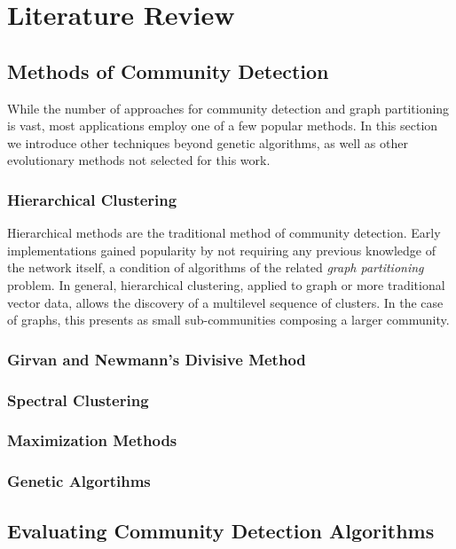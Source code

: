 \chapter{Literature Review}




\section{Methods of Community Detection}
While the number of approaches for community detection and graph partitioning is vast, most applications employ one of a few popular methods. In this section we introduce other techniques beyond genetic algorithms, as well as other evolutionary methods not selected for this work. 

\subsection{Hierarchical Clustering}
Hierarchical methods are the traditional method of community detection. Early implementations gained popularity by not requiring any previous knowledge of the network itself, a condition of algorithms of the related \textit{graph partitioning} problem. In general, hierarchical clustering, applied to graph or more traditional vector data, allows the discovery of a multilevel sequence of clusters. In the case of graphs, this presents as small sub-communities composing a larger community.


\subsection{Girvan and Newmann's Divisive Method}
\cite{Girvan2002}




\subsection{Spectral Clustering}



\subsection{Maximization Methods}





\subsection{Genetic Algortihms}





\cite{Brandes}





\section{Evaluating Community Detection Algorithms}




